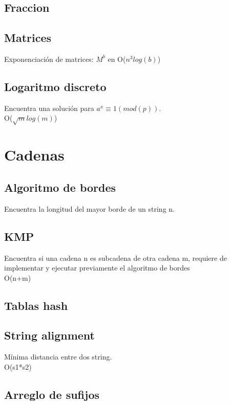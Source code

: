 \documentclass[10pt,landscape,twocolumn,a4paper,notitlepage]{article}
\newcommand\cppfile[2][]{

}
\begin{document}
			\subsection{Fraccion}
			\cppfile[9-47]{matematicas/fraccion.cpp}
			\subsection{Matrices}
			Exponenciación de matrices: $M^b$ en O($n^{3} log (b)$)
			\cppfile[8-36]{matematicas/matrices.cpp}
			\subsection{Logaritmo discreto}
			Encuentra una solución para $a^{x} \equiv 1 (mod(p))$.\\ O($\sqrt{m} log (m)$)
			\cppfile[7-25]{matematicas/logaritmo_discreto.cpp}
			
		\section{Cadenas}
			\subsection{Algoritmo de bordes}
			Encuentra la longitud del mayor borde de un string n.
			\cppfile[4-16]{cadenas/bordes.cpp}
			\subsection{KMP}
			Encuentra si una cadena n es subcadena de otra cadena m, requiere de implementar
			y ejecutar previamente el algoritmo de bordes\\
			O(n+m)
			\cppfile[18-29]{cadenas/kmp.cpp}
			\subsection{Tablas hash}
			\cppfile[5-16]{cadenas/Hashing.cpp}
			\subsection{String alignment}
			Mínima distancia entre dos string.\\O(s1*s2)
			\cppfile[8-25]{cadenas/string_distance.cpp}
			\subsection{Arreglo de sufijos}
			\cppfile[7-48]{cadenas/Arreglo_de_sufijos.cpp}
\end{document}

